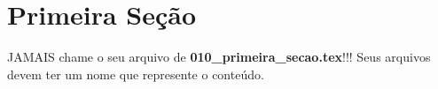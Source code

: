 \section{Primeira Seção}

  JAMAIS chame o seu arquivo de \textbf{010\_primeira\_secao.tex}!!!
  Seus arquivos devem ter um nome que represente o conteúdo.
